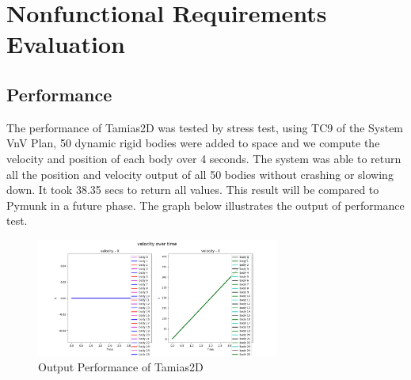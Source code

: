 \documentclass[12pt, titlepage]{article}
\newcommand{\progname}{Tamias2D}
\begin{document}
\section{Nonfunctional Requirements Evaluation}

\subsection{Performance}
The performance of \progname{} was tested by stress test, using TC9 of the System VnV Plan, 50 dynamic rigid bodies were added to space and we compute the velocity and position of each body over 4 seconds. The system was able to return all the position and velocity output of all 50 bodies without crashing or slowing down. It took 38.35 secs to return all values.
This result will be compared to Pymunk in a future phase.
The graph below illustrates the output of performance test.
\begin{figure}[htbp]
	
	\begin{center}
		
		{
			\includegraphics[width=0.71\textwidth]{stresstest.png}
			
		} 
		\caption{\label{Fig_stress}Output Performance of \progname{}}
		
	\end{center}
	
\end{figure}


	
\end{document}
